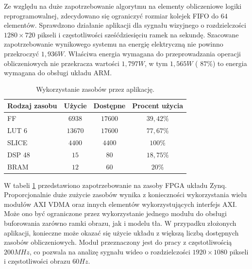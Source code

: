 Ze względu na duże zapotrzebowanie algorytmu na elementy obliczeniowe logiki reprogramowalnej, zdecydowano się ograniczyć rozmiar kolejek FIFO do $64$ elementów.
Sprawdzono działanie aplikacji dla sygnału wizyjnego o rozdzielczości $1280 \times 720$ pikseli i częstotliwości sześćdziesięciu ramek na sekundę.
Szacowane zapotrzebowanie wynikowego systemu na energię elektryczną nie powinno przekroczyć $1,936W$. Właściwa energia wymagana do przeprowadzania operacji obliczeniowych nie przekracza wartości $1,797W$, w tym $1,565W$ ( $87\%$) to energia wymagana do obsługi układu ARM.


\begin{table}[h]
	\caption{Wykorzystanie zasobów przez aplikację.}
	\centering
	\label{tab;background-model-utilization}
	\begin{tabular}{|l|c|c|c|}
		\hline
		\textbf{Rodzaj zasobu} & \textbf{Użycie} & \textbf{Dostępne} & \textbf{Procent użycia}      \\ \hline
		FF                     & $6938$            & $17600$             & $39,42\%$                 \\ \hline
		LUT 6                  & $13670$            & $17600$             & $77,67\%$                 \\ \hline
		SLICE                  & $4400$            & $4400$             & $100\%$                 \\ \hline
		DSP 48                 & $15$               & $80$                & $18,75\%$                    \\ \hline
		BRAM                   & $12$               & $60$                & $20\%$                   \\ \hline
	\end{tabular}
\end{table}

W tabeli \ref{tab;background-model-utilization} przedstawiono zapotrzebowanie na zasoby FPGA układu Zynq.
Proporcjonalnie duże zużycie zasobów wynika z konieczności wykorzystania wielu modułów AXI VDMA oraz innych elementów wykorzystujących interfejs AXI. 
Może ono być ograniczone przez wykorzystanie jednego modułu do obsługi buforowania zarówno ramki obrazu, jak i modelu tła. 
W przypadku złożonych aplikacji, konieczne może okazać się użycie układu z większą liczbą dostępnych zasobów obliczeniowych. %
Moduł przeznaczony jest do pracy z częstotliwością $200MHz$, co pozwala na analizę sygnału wideo o rozdzielczości $1920 \times 1080$ pikseli i częstotliwości obrazu $60Hz$.

